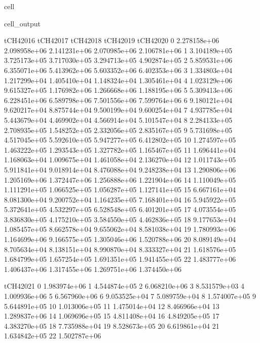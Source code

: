 \documentclass[letterpaper,10pt,english]{jupyterBook}
\begin{document}
\begin{sphinxuseclass}{cell}
\begin{sphinxVerbatimOutput}
\begin{sphinxuseclass}{cell_output}
\begin{sphinxVerbatim}[commandchars=\\\{\}]
       tCH4\PYGZus{}2016     tCH4\PYGZus{}2017     tCH4\PYGZus{}2018     tCH4\PYGZus{}2019     tCH4\PYGZus{}2020  \PYGZbs{}
0   2.278158e+06  2.098958e+06  2.141231e+06  2.070985e+06  2.106781e+06   
1   3.104189e+05  3.725173e+05  3.717030e+05  3.294713e+05  4.902874e+05   
2   5.859531e+06  6.355071e+06  5.413962e+06  5.603352e+06  6.402353e+06   
3   1.334803e+04  1.217299e+04  1.405410e+04  1.148324e+04  1.305461e+04   
4   1.023129e+06  9.615327e+05  1.176982e+06  1.266668e+06  1.188195e+06   
5   5.309413e+06  6.228451e+06  6.589798e+06  7.501556e+06  7.599764e+06   
6   9.180121e+04  9.620217e+04  8.875744e+04  9.500199e+04  9.600254e+04   
7   4.937785e+04  5.443679e+04  4.469902e+04  4.566914e+04  5.101547e+04   
8   2.284133e+05  2.708935e+05  1.548252e+05  2.332056e+05  2.835167e+05   
9   5.731698e+05  4.517045e+05  5.592610e+05  5.947277e+05  6.412802e+05   
10  1.274597e+05  1.463222e+05  1.293543e+05  1.327782e+05  1.165467e+05   
11  1.696441e+04  1.168063e+04  1.009675e+04  1.461058e+04  2.136270e+04   
12  1.011743e+05  5.911841e+04  9.018914e+04  8.476088e+04  9.248238e+04   
13  1.290806e+06  1.205169e+06  1.372447e+06  1.256888e+06  1.221904e+06   
14  1.110049e+05  1.111291e+05  1.066525e+05  1.056287e+05  1.127141e+05   
15  6.667161e+04  8.081300e+04  9.200752e+04  1.164235e+05  7.168401e+04   
16  5.945922e+05  5.372641e+05  4.532297e+05  6.528548e+05  6.401201e+05   
17  4.073554e+05  3.836830e+05  4.175210e+05  3.584550e+05  4.462836e+05   
18  9.177653e+04  1.085457e+05  8.662578e+04  9.655062e+04  8.581038e+04   
19  1.780993e+06  1.164699e+06  9.166575e+05  1.305046e+06  1.520788e+06   
20  8.089149e+04  8.705634e+04  8.138151e+04  8.990870e+04  8.333327e+04   
21  1.618576e+05  1.684799e+05  1.657254e+05  1.691351e+05  1.941455e+05   
22  1.483777e+06  1.406437e+06  1.317455e+06  1.269751e+06  1.374450e+06   

       tCH4\PYGZus{}2021  
0   1.983974e+06  
1   4.544874e+05  
2   6.068210e+06  
3   8.531579e+03  
4   1.009936e+06  
5   6.567960e+06  
6   9.053525e+04  
7   5.089759e+04  
8   1.574007e+05  
9   5.644891e+05  
10  1.013006e+05  
11  1.475014e+04  
12  8.466966e+04  
13  1.289837e+06  
14  1.069696e+05  
15  4.811408e+04  
16  4.849205e+05  
17  4.383270e+05  
18  7.735988e+04  
19  8.528673e+05  
20  6.619861e+04  
21  1.634842e+05  
22  1.502787e+06  
\end{sphinxVerbatim}

\end{sphinxuseclass}\end{sphinxVerbatimOutput}

\end{sphinxuseclass}
\end{document}
